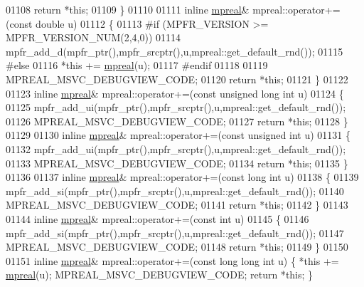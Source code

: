 \begin{DoxyCode}
01108     \textcolor{keywordflow}{return} *\textcolor{keyword}{this};
01109 \}
01110 
01111 \textcolor{keyword}{inline} \hyperlink{classmpfr_1_1mpreal}{mpreal}& mpreal::operator+= (\textcolor{keyword}{const} \textcolor{keywordtype}{double} u)
01112 \{
01113 \textcolor{preprocessor}{#if (MPFR\_VERSION >= MPFR\_VERSION\_NUM(2,4,0))}
01114     mpfr\_add\_d(mpfr\_ptr(),mpfr\_srcptr(),u,mpreal::get\_default\_rnd());
01115 \textcolor{preprocessor}{#else}
01116     *\textcolor{keyword}{this} += \hyperlink{classmpfr_1_1mpreal}{mpreal}(u);
01117 \textcolor{preprocessor}{#endif}
01118 
01119     MPREAL\_MSVC\_DEBUGVIEW\_CODE;
01120     \textcolor{keywordflow}{return} *\textcolor{keyword}{this};
01121 \}
01122 
01123 \textcolor{keyword}{inline} \hyperlink{classmpfr_1_1mpreal}{mpreal}& mpreal::operator+=(\textcolor{keyword}{const} \textcolor{keywordtype}{unsigned} \textcolor{keywordtype}{long} \textcolor{keywordtype}{int} u)
01124 \{
01125     mpfr\_add\_ui(mpfr\_ptr(),mpfr\_srcptr(),u,mpreal::get\_default\_rnd());
01126     MPREAL\_MSVC\_DEBUGVIEW\_CODE;
01127     \textcolor{keywordflow}{return} *\textcolor{keyword}{this};
01128 \}
01129 
01130 \textcolor{keyword}{inline} \hyperlink{classmpfr_1_1mpreal}{mpreal}& mpreal::operator+=(\textcolor{keyword}{const} \textcolor{keywordtype}{unsigned} \textcolor{keywordtype}{int} u)
01131 \{
01132     mpfr\_add\_ui(mpfr\_ptr(),mpfr\_srcptr(),u,mpreal::get\_default\_rnd());
01133     MPREAL\_MSVC\_DEBUGVIEW\_CODE;
01134     \textcolor{keywordflow}{return} *\textcolor{keyword}{this};
01135 \}
01136 
01137 \textcolor{keyword}{inline} \hyperlink{classmpfr_1_1mpreal}{mpreal}& mpreal::operator+=(\textcolor{keyword}{const} \textcolor{keywordtype}{long} \textcolor{keywordtype}{int} u)
01138 \{
01139     mpfr\_add\_si(mpfr\_ptr(),mpfr\_srcptr(),u,mpreal::get\_default\_rnd());
01140     MPREAL\_MSVC\_DEBUGVIEW\_CODE;
01141     \textcolor{keywordflow}{return} *\textcolor{keyword}{this};
01142 \}
01143 
01144 \textcolor{keyword}{inline} \hyperlink{classmpfr_1_1mpreal}{mpreal}& mpreal::operator+=(\textcolor{keyword}{const} \textcolor{keywordtype}{int} u)
01145 \{
01146     mpfr\_add\_si(mpfr\_ptr(),mpfr\_srcptr(),u,mpreal::get\_default\_rnd());
01147     MPREAL\_MSVC\_DEBUGVIEW\_CODE;
01148     \textcolor{keywordflow}{return} *\textcolor{keyword}{this};
01149 \}
01150 
01151 \textcolor{keyword}{inline} \hyperlink{classmpfr_1_1mpreal}{mpreal}& mpreal::operator+=(\textcolor{keyword}{const} \textcolor{keywordtype}{long} \textcolor{keywordtype}{long} \textcolor{keywordtype}{int} u)         \{    *\textcolor{keyword}{this} += 
      \hyperlink{classmpfr_1_1mpreal}{mpreal}(u); MPREAL\_MSVC\_DEBUGVIEW\_CODE; \textcolor{keywordflow}{return} *\textcolor{keyword}{this};    \}

\end{DoxyCode}
